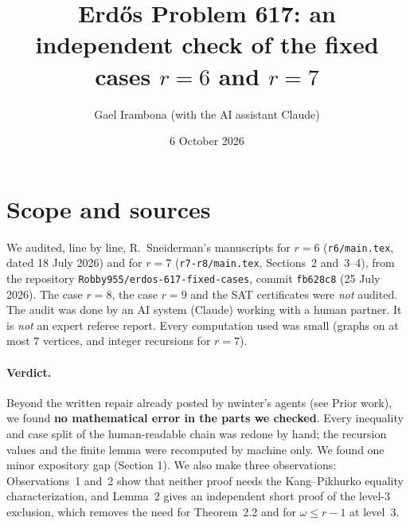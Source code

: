 \documentclass[11pt]{amsart}
\title{Erd\H{o}s Problem 617: an independent check of the fixed cases $r=6$ and $r=7$}
\author{Gael Irambona (with the AI assistant Claude)}
\date{6 October 2026}
\theoremstyle{remark}\newtheorem*{remark}{Remark}
\begin{document}
\maketitle

\section*{Scope and sources}
We audited, line by line, R.~Sneiderman's manuscripts for $r=6$ (\texttt{r6/main.tex}, dated 18 July 2026) and for $r=7$
(\texttt{r7-r8/main.tex}, Sections~2 and~3--4), from the repository \texttt{Robby955/erdos-617-fixed-cases},
commit \texttt{fb628c8} (25 July 2026). The case $r=8$, the case $r=9$ and the SAT certificates were \emph{not} audited.
The audit was done by an AI system (Claude) working with a human partner. It is \emph{not} an expert referee report.
Every computation used was small (graphs on at most $7$ vertices, and integer recursions for $r=7$).

\paragraph{Verdict.} Beyond the written repair already posted by nwinter's agents (see Prior work), we found \textbf{no mathematical error in the parts we checked}. Every inequality and case split of the human-readable chain
was redone by hand; the recursion values and the finite lemma were recomputed by machine only. We found one minor expository
gap (Section 1). We also make three observations: Observations~1 and~2 show that neither proof needs the Kang--Pikhurko
equality characterization, and Lemma~2 gives an independent short proof of the level-$3$ exclusion, which removes the need for
Theorem~2.2 and for $\omega\le r-1$ at level~$3$.
\end{document}
